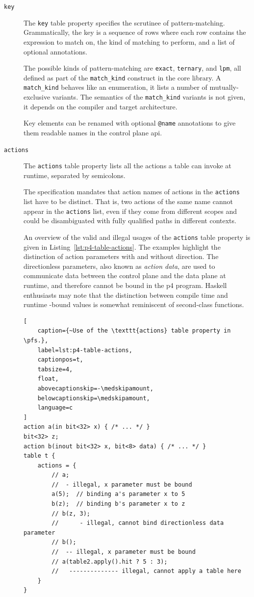 
\begin{description}

\item[\texttt{key}] The \texttt{key} table property specifies the scrutinee of
pattern-matching. Grammatically, the key is a sequence of rows where each row
contains the expression to match on, the kind of matching to perform, and a list
of optional annotations.

The possible kinds of pattern-matching are \texttt{exact}, \texttt{ternary}, and
\texttt{lpm}, all defined as part of the \texttt{match\_kind} construct in the
core library. A
\texttt{match\_kind} behaves like an enumeration, it lists a number of
mutually-exclusive variants. The semantics of the \texttt{match\_kind} variants
is not given, it depends on the compiler and target architecture.

Key elements can be renamed with optional \texttt{@name} annotations to give
them readable names in the control plane \acrshort{api}.

\item[\texttt{actions}] The \texttt{actions} table property lists all the
actions a table can invoke at runtime, separated by semicolons.

The specification mandates that action names of actions in the \texttt{actions}
list have to be distinct. That is, two actions of the same name cannot appear in
the \texttt{actions} list, even if they come from different scopes and could be
disambiguated with fully qualified paths in different contexts.

An overview of the valid and illegal usages of the \texttt{actions} table
property is given in Listing~\ref{lst:p4-table-actions}. The examples highlight
the distinction of action parameters with and without direction. The
directionless parameters, also known as \emph{action data}, are used to
communicate data between the control plane and the data plane at runtime, and
therefore cannot be bound in the \acrshort{p4} program. Haskell enthusiasts may
note that the distinction between compile time and runtime -bound values is
somewhat reminiscent of second-class functions.

\begin{lstlisting}[
	caption={~Use of the \texttt{actions} table property in \pfs.},
	label=lst:p4-table-actions,
	captionpos=t,
	tabsize=4,
	float,
	abovecaptionskip=-\medskipamount,
	belowcaptionskip=\medskipamount,
	language=c
]
action a(in bit<32> x) { /* ... */ }
bit<32> z;
action b(inout bit<32> x, bit<8> data) { /* ... */ }
table t {
	actions = {
		// a;
		//  - illegal, x parameter must be bound
		a(5);  // binding a's parameter x to 5
		b(z);  // binding b's parameter x to z
		// b(z, 3);
		//      - illegal, cannot bind directionless data parameter
		// b();
		//  -- illegal, x parameter must be bound
		// a(table2.apply().hit ? 5 : 3);
		//   -------------- illegal, cannot apply a table here
	}
}
\end{lstlisting}


\end{description}
